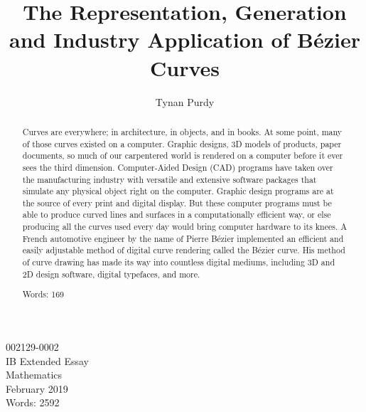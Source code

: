 \documentclass[12pt,letterpaper]{article}
\title{The Representation, Generation and Industry Application of B\'ezier Curves}
\author{Tynan Purdy}
\date{\vspace{-5ex}}
\begin{document}
\large
\parindent=0.5in
{\fontsize{12}{14.4}
	{\singlespace
	    \maketitle
	    \begin{center}
	    \vspace{4mm}
	    002129-0002 \\
	    \vspace{4mm}
	    IB Extended Essay \\
	    \vspace{4mm}
	    Mathematics \\
	    \vspace{4mm}
	    February 2019 \\
	    \vspace{4mm}
	    Words: 2592 \\
	\end{center}
	}
}	

\newpage
{}
\begin{abstract}
Curves are everywhere; in architecture, in objects, and in books. At some point, many of those curves existed on a computer. Graphic designs, 3D models of products, paper documents, so much of our carpentered world is rendered on a computer before it ever sees the third dimension. Computer-Aided Design (CAD) programs have taken over the manufacturing industry with versatile and extensive software packages that simulate any physical object right on the computer. Graphic design programs are at the source of every print and digital display. But these computer programs must be able to produce curved lines and surfaces in a computationally efficient way, or else producing all the curves used every day would bring computer hardware to its knees. A French automotive engineer by the name of Pierre B\'ezier implemented an efficient and easily adjustable method of digital curve rendering called the B\'ezier curve. His method of curve drawing has made its way into countless digital mediums, including 3D and 2D design software, digital typefaces, and more.

Words: 169

\end{abstract}

\newpage
\tableofcontents

\newpage
\end{document}
